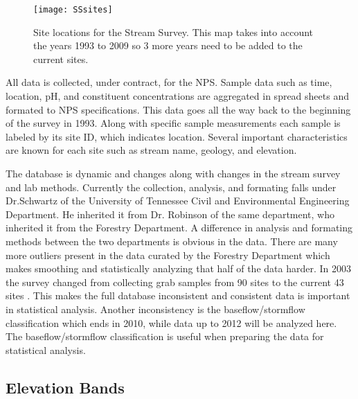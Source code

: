 \begin{figure}[h!]
  \centering
  \texttt{[image: SSsites]}\\
  \caption{Site locations for the Stream Survey.  This map takes into account the years 1993 to 2009 so 3 more years need to be added to the current sites. }\label{fig:SSsites}
\end{figure}

All data is collected, under contract, for the NPS.
Sample data such as time, location, pH, and constituent concentrations are aggregated in spread sheets and formated to NPS specifications.
This data goes all the way back to the beginning of the survey in 1993.
Along with specific sample measurements each sample is labeled by its site ID, which indicates location.
Several important characteristics are known for each site such as stream name, geology, and elevation.

The database is dynamic and changes along with changes in the stream survey and lab methods.
Currently the collection, analysis, and formating falls under Dr.Schwartz of the University of Tennessee Civil and Environmental Engineering Department.
He inherited it from Dr. Robinson of the same department, who inherited it from the Forestry Department.
A difference in analysis and formating methods between the two departments is obvious in the data.
There are many more outliers present in the data curated by the Forestry Department which makes smoothing and statistically analyzing that half of the data harder.
In 2003 the survey changed from collecting grab samples from 90 sites to the current 43 sites \citep{odom2003}.
This makes the full database inconsistent and consistent data is important in statistical analysis.
Another inconsistency is the baseflow/stormflow classification which ends in 2010, while data up to 2012 will be analyzed here.
The baseflow/stormflow classification is useful when preparing the data for statistical analysis.

\subsection{Elevation Bands}

